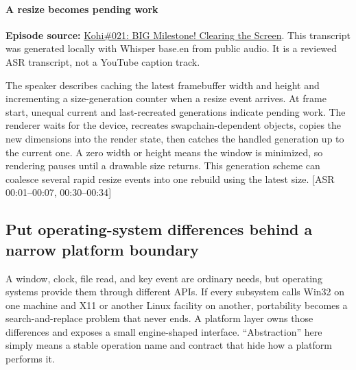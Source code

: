 \paragraph{A resize becomes pending work}\label{05-engine-i-ch013-a-resize-becomes-pending-work}

\hypertarget{05-engine-i-ch013-a-resize-becomes-pending-work}{}

\textbf{Episode source:} \href{https://www.youtube.com/watch?v=hRL71D1f3pU}{Kohi\#021: BIG Milestone! Clearing the Screen}. This transcript was generated locally with Whisper base.en from public audio. It is a reviewed ASR transcript, not a YouTube caption track.

The speaker describes caching the latest framebuffer width and height and incrementing a size-generation counter when a resize event arrives. At frame start, unequal current and last-recreated generations indicate pending work. The renderer waits for the device, recreates swapchain-dependent objects, copies the new dimensions into the render state, then catches the handled generation up to the current one. A zero width or height means the window is minimized, so rendering pauses until a drawable size returns. This generation scheme can coalesce several rapid resize events into one rebuild using the latest size. {[}ASR 00:01--00:07, 00:30--00:34{]}

\subsection{Put operating-system differences behind a narrow platform boundary}\label{05-engine-i-ch013-put-operating-system-differences-behind-a-narrow-platform-boundary}

\hypertarget{05-engine-i-ch013-put-operating-system-differences-behind-a-narrow-platform-boundary}{}

A window, clock, file read, and key event are ordinary needs, but operating systems provide them through different APIs. If every subsystem calls Win32 on one machine and X11 or another Linux facility on another, portability becomes a search-and-replace problem that never ends. A platform layer owns those differences and exposes a small engine-shaped interface. ``Abstraction'' here simply means a stable operation name and contract that hide how a platform performs it.

